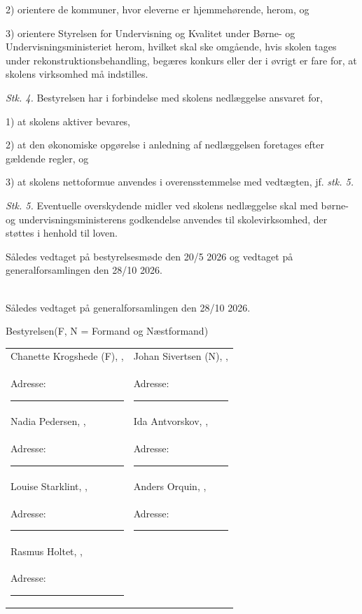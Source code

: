 \documentclass[11pt, a4paper]{article}
\begin{document}
2) orientere de kommuner, hvor eleverne er hjemmehørende, herom, og

3) orientere Styrelsen for Undervisning og Kvalitet under Børne- og Undervisningsministeriet herom, hvilket skal ske omgående, hvis skolen tages under rekonstruktionsbehandling, begæres konkurs eller der i øvrigt er fare for, at skolens virksomhed må indstilles.

\textit{Stk. 4.} Bestyrelsen har i forbindelse med skolens nedlæggelse ansvaret for,

1) at skolens aktiver bevares,

2) at den økonomiske opgørelse i anledning af nedlæggelsen foretages efter gældende regler, og

3) at skolens nettoformue anvendes i overensstemmelse med vedtægten, jf. \textit{stk. 5.}

\textit{Stk. 5.} Eventuelle overskydende midler ved skolens nedlæggelse skal med børne- og undervisningsministerens godkendelse anvendes til skolevirksomhed, der støttes i henhold til loven.


Således vedtaget på bestyrelsesmøde den 20/5 2026 og vedtaget på generalforsamlingen den 28/10 2026.

\vspace{3em} %

\pagebreak
{} \\[0.5em]
Således vedtaget på generalforsamlingen den 28/10 2026.

Bestyrelsen(F, N = Formand og Næstformand)

\noindent
\begin{tabular}{p{7cm}p{7cm}}
Chanette Krogshede (F), \underline{\hspace{2cm}}, & Johan Sivertsen (N), \underline{\hspace{2cm}}, \\
Adresse: \rule{5cm}{0.4pt} & Adresse: \rule{5cm}{0.4pt} \\[2.5em]

Nadia Pedersen, \underline{\hspace{2cm}}, & Ida Antvorskov, \underline{\hspace{2cm}}, \\
Adresse: \rule{5cm}{0.4pt} & Adresse: \rule{5cm}{0.4pt} \\[2.5em]

Louise Starklint, \underline{\hspace{2cm}}, & Anders Orquin, \underline{\hspace{2cm}}, \\
Adresse: \rule{5cm}{0.4pt} & Adresse: \rule{5cm}{0.4pt} \\[2.5em]

Rasmus Holtet, \underline{\hspace{2cm}}, & \\
Adresse: \rule{5cm}{0.4pt} & \\
\end{tabular}
\end{document}
